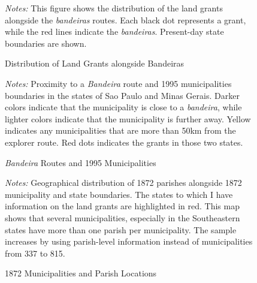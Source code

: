 \documentclass[11pt]{article}
\begin{document}
  \clearpage
  
  \begin{figure}
    \caption{Distribution of Land Grants alongside Bandeiras}
    \begin{center}
    \end{center}
    \textit{Notes:} This figure shows the distribution of the land grants alongside the \textit{bandeiras} routes. Each black dot represents a grant, while the red lines indicate the \textit{bandeiras}. Present-day state boundaries are shown.
    \label{fig:Bandeiras}
  \end{figure}
  
  \begin{figure}[h!]
    \caption{\textit{Bandeira} Routes and 1995 Municipalities}
    \begin{center}
    \end{center}
    \textit{Notes:} Proximity to a \textit{Bandeira} route and 1995 municipalities boundaries in the states of Sao Paulo and Minas Gerais. Darker colors indicate that the municipality is close to a \textit{bandeira}, while lighter colors indicate that the municipality is further away. Yellow indicates any municipalities that are more than 50km from the explorer route. Red dots indicates the grants in those two states.
    \label{fig:bandeira_dist}
  \end{figure}
  
  \clearpage

\clearpage

\begin{figure}[h!]
  \caption{1872 Municipalities and Parish Locations}
  \begin{center}
  \end{center}
  \textit{Notes:} Geographical distribution of 1872 parishes alongside 1872 municipality and state boundaries. The states to which I have information on the land grants are highlighted in red. This map shows that several municipalities, especially in the Southeastern states have more than one parish per municipality. The sample increases by using parish-level information instead of municipalities from 337 to 815.
  \label{fig:parishes_1872}
\end{figure}
\end{document}
